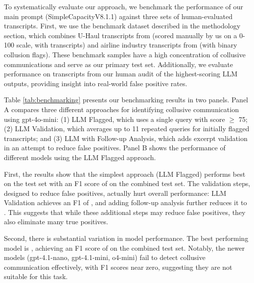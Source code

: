 To systematically evaluate our approach, we benchmark the performance of our main prompt (SimpleCapacityV8.1.1) against three sets of human-evaluated transcripts. First, we use the benchmark dataset described in the methodology section, which combines U-Haul transcripts from \textcite{harrington2022collusion} (scored manually by us on a 0-100 scale, with  transcripts) and airline industry transcripts from \textcite{aryal2022coordinated} (with  binary collusion flags). These benchmark samples have a high concentration of collusive communications and serve as our primary test set. Additionally, we evaluate performance on  transcripts from our human audit of the highest-scoring LLM outputs, providing insight into real-world false positive rates.

Table \ref{tab:benchmarking} presents our benchmarking results in two panels. Panel A compares three different approaches for identifying collusive communication using gpt-4o-mini: (1) LLM Flagged, which uses a single query with score $\geq$ 75; (2) LLM Validation, which averages up to 11 repeated queries for initially flagged transcripts; and (3) LLM with Follow-up Analysis, which adds excerpt validation in an attempt to reduce false positives. Panel B shows the performance of different models using the LLM Flagged approach.

First, the results show that the simplest approach (LLM Flagged) performs best on the test set with an F1 score of  on the combined test set. The validation steps, designed to reduce false positives, actually hurt overall performance: LLM Validation achieves an F1 of , and adding follow-up analysis further reduces it to . This suggests that while these additional steps may reduce false positives, they also eliminate many true positives.

Second, there is substantial variation in model performance. The best performing model is , achieving an F1 score of  on the combined test set. Notably, the newer models (gpt-4.1-nano, gpt-4.1-mini, o4-mini) fail to detect collusive communication effectively, with F1 scores near zero, suggesting they are not suitable for this task.

